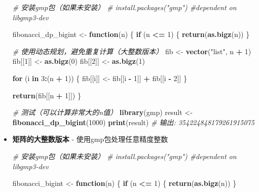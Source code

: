 \documentclass[
]{book}
\newenvironment{Shaded}{\begin{snugshade}}{\end{snugshade}}
\newcommand{\CommentTok}[1]{\textcolor[rgb]{0.56,0.35,0.01}{\textit{#1}}}
\newcommand{\ControlFlowTok}[1]{\textcolor[rgb]{0.13,0.29,0.53}{\textbf{#1}}}
\newcommand{\DecValTok}[1]{\textcolor[rgb]{0.00,0.00,0.81}{#1}}
\newcommand{\FunctionTok}[1]{\textcolor[rgb]{0.13,0.29,0.53}{\textbf{#1}}}
\newcommand{\NormalTok}[1]{#1}
\newcommand{\OtherTok}[1]{\textcolor[rgb]{0.56,0.35,0.01}{#1}}
\newcommand{\SpecialCharTok}[1]{\textcolor[rgb]{0.81,0.36,0.00}{\textbf{#1}}}
\newcommand{\StringTok}[1]{\textcolor[rgb]{0.31,0.60,0.02}{#1}}
\begin{document}
\begin{itemize}
\begin{Shaded}
\begin{Highlighting}[]
\CommentTok{\# 安装gmp包（如果未安装）}
\CommentTok{\# install.packages("gmp") \#dependent on libgmp3{-}dev}

\NormalTok{fibonacci\_dp\_bigint }\OtherTok{\textless{}{-}} \ControlFlowTok{function}\NormalTok{(n) \{}
  \ControlFlowTok{if}\NormalTok{ (n }\SpecialCharTok{\textless{}=} \DecValTok{1}\NormalTok{) \{}
    \FunctionTok{return}\NormalTok{(}\FunctionTok{as.bigz}\NormalTok{(n))}
\NormalTok{  \}}

  \CommentTok{\# 使用动态规划，避免重复计算（大整数版本）}
\NormalTok{  fib }\OtherTok{\textless{}{-}} \FunctionTok{vector}\NormalTok{(}\StringTok{"list"}\NormalTok{, n }\SpecialCharTok{+} \DecValTok{1}\NormalTok{)}
\NormalTok{  fib[[}\DecValTok{1}\NormalTok{]] }\OtherTok{\textless{}{-}} \FunctionTok{as.bigz}\NormalTok{(}\DecValTok{0}\NormalTok{)}
\NormalTok{  fib[[}\DecValTok{2}\NormalTok{]] }\OtherTok{\textless{}{-}} \FunctionTok{as.bigz}\NormalTok{(}\DecValTok{1}\NormalTok{)}

  \ControlFlowTok{for}\NormalTok{ (i }\ControlFlowTok{in} \DecValTok{3}\SpecialCharTok{:}\NormalTok{(n }\SpecialCharTok{+} \DecValTok{1}\NormalTok{)) \{}
\NormalTok{    fib[[i]] }\OtherTok{\textless{}{-}}\NormalTok{ fib[[i }\SpecialCharTok{{-}} \DecValTok{1}\NormalTok{]] }\SpecialCharTok{+}\NormalTok{ fib[[i }\SpecialCharTok{{-}} \DecValTok{2}\NormalTok{]]}
\NormalTok{  \}}

  \FunctionTok{return}\NormalTok{(fib[[n }\SpecialCharTok{+} \DecValTok{1}\NormalTok{]])}
\NormalTok{\}}

\CommentTok{\# 测试（可以计算非常大的n值）}
\FunctionTok{library}\NormalTok{(gmp)}
\NormalTok{result }\OtherTok{\textless{}{-}} \FunctionTok{fibonacci\_dp\_bigint}\NormalTok{(}\DecValTok{1000}\NormalTok{)}
\FunctionTok{print}\NormalTok{(result)  }\CommentTok{\# 输出: 354224848179261915075}
\end{Highlighting}
\end{Shaded}
\item
  \textbf{矩阵的大整数版本} - 使用gmp包处理任意精度整数

\begin{Shaded}
\begin{Highlighting}[]
\CommentTok{\# 安装gmp包（如果未安装）}
\CommentTok{\# install.packages("gmp") \#dependent on libgmp3{-}dev}

\NormalTok{fibonacci\_bigint }\OtherTok{\textless{}{-}} \ControlFlowTok{function}\NormalTok{(n) \{}
  \ControlFlowTok{if}\NormalTok{ (n }\SpecialCharTok{\textless{}=} \DecValTok{1}\NormalTok{) \{}
    \FunctionTok{return}\NormalTok{(}\FunctionTok{as.bigz}\NormalTok{(n))}
\NormalTok{  \}}


\end{Highlighting}
\end{Shaded}
\end{itemize}
\end{document}
